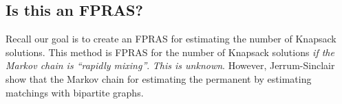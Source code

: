 \documentclass[12pt]{article}
\theoremstyle{definition}
\begin{document}
\subsection*{Is this an FPRAS?}
Recall our goal is to create an FPRAS for estimating the number of Knapsack solutions. This method is FPRAS for the number of Knapsack solutions \textit{if the Markov chain is ``rapidly mixing''}. \textit{This is unknown}. 
However, Jerrum-Sinclair show that the Markov chain for estimating the permanent by estimating matchings with bipartite graphs. 
\end{document}
